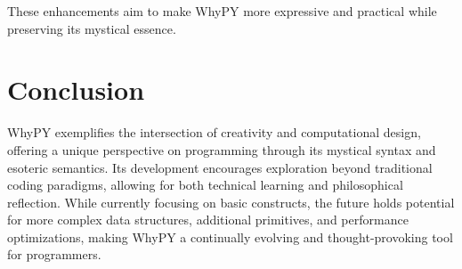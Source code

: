 \documentclass[conference]{IEEEtran}
\begin{document}
These enhancements aim to make WhyPY more expressive and practical while preserving its mystical essence.


\section{Conclusion}
WhyPY exemplifies the intersection of creativity and computational design, offering a unique perspective on programming through its mystical syntax and esoteric semantics. Its development encourages exploration beyond traditional coding paradigms, allowing for both technical learning and philosophical reflection. While currently focusing on basic constructs, the future holds potential for more complex data structures, additional primitives, and performance optimizations, making WhyPY a continually evolving and thought-provoking tool for programmers.
\end{document}
